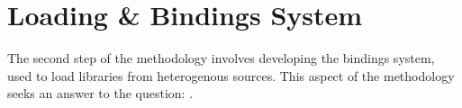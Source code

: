 


\section{Loading \& Bindings System} 
\label{sec:method-bindings}

The second step of the methodology involves developing the bindings system, 
used to load libraries from heterogenous sources. 
This aspect of the methodology seeks an answer to the question: \mySubRQThree.


